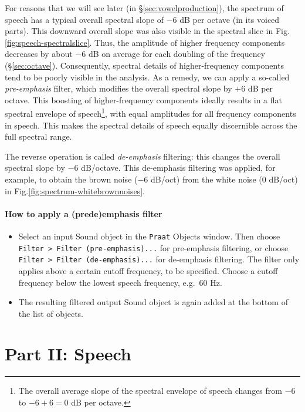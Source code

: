 \documentclass[
]{book}
\begin{document}
For reasons that we will see later (in §\ref{sec:vowelproduction}), the spectrum of speech has a typical overall spectral slope of \(-6\) dB per octave (in its voiced parts). This downward overall slope was also visible in the spectral slice in Fig.\ref{fig:speech-spectralslice}. Thus, the amplitude of higher frequency components decreases by about \(-6\) dB on average for each doubling of the frequency (§\ref{sec:octave}).
Consequently, spectral details of higher-frequency components tend to be poorly visible in the analysis. As a remedy, we can apply a so-called \emph{pre-emphasis} filter, which modifies the overall spectral slope by \(+6\) dB per octave. This boosting of higher-frequency components ideally results in a flat spectral envelope of speech\footnote{The overall average slope of the spectral envelope of speech changes from \(-6\) to \(-6+6=0\) dB per octave.}, with equal amplitudes for all frequency components in speech. This makes the spectral details of speech equally discernible across the full spectral range.

The reverse operation is called \emph{de-emphasis} filtering: this changes the overall spectral slope by \(-6\) dB/octave. This de-emphasis filtering was applied, for example, to obtain the brown noise (\(-6\) dB/oct) from the white noise (\(0\) dB/oct) in Fig.\ref{fig:spectrum-whitebrownnoises}.

\label{box-praatemphasis}
\subsection{How to apply a (pre\textbar de)emphasis filter}\label{how-to-apply-a-predeemphasis-filter}

\begin{itemize}
\item
  Select an input Sound object in the \texttt{Praat} Objects window. Then choose \texttt{Filter\ \textgreater{}\ Filter\ (pre-emphasis)...} for pre-emphasis filtering, or choose \texttt{Filter\ \textgreater{}\ Filter\ (de-emphasis)...} for de-emphasis filtering. The filter only applies above a certain cutoff frequency, to be specified. Choose a cutoff frequency below the lowest speech frequency, e.g.~60 Hz.
\item
  The resulting filtered output Sound object is again added at the bottom of the list of objects.
\end{itemize}

\part*{Part II: Speech}\label{part-part-ii-speech}
\end{document}
